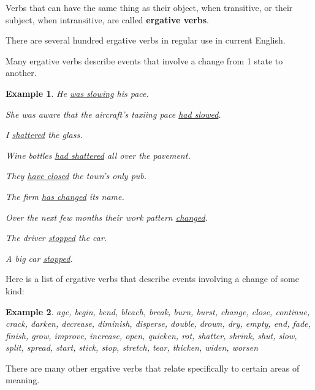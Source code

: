 \documentclass[oneside]{book}
\numberwithin{equation}{section}
\newtheorem{example}{Example}[section]
\begin{document}
%
Verbs that can have the same thing as their object, when transitive, or their subject, when intransitive, are called \textbf{ergative verbs}.

There are several hundred ergative verbs in regular use in current English.

%
\noindent{} Many ergative verbs describe events that involve a change from 1 state to another.
\begin{example}
    He \underline{was slowing} his pace.
    
    She was aware that the aircraft's taxiing pace \underline{had slowed}.
    
    I \underline{shattered} the glass.
    
    Wine bottles \underline{had shattered} all over the pavement.
    
    They \underline{have closed} the town's only pub.
    
    The firm \underline{has changed} its name.
    
    Over the next few months their work pattern \underline{changed}.
    
    The driver \underline{stopped} the car.
    
    A big car \underline{stopped}.
\end{example}
%
\noindent{} Here is a list of ergative verbs that describe events involving a change of some kind:
\begin{example}
    age, begin, bend, bleach, break, burn, burst, change, close, continue, crack, darken, decrease, diminish, disperse, double, drown, dry, empty, end, fade, finish, grow, improve, increase, open, quicken, rot, shatter, shrink, shut, slow, split, spread, start, stick, stop, stretch, tear, thicken, widen, worsen
\end{example}
%
\noindent{} There are many other ergative verbs that relate specifically to certain areas of meaning.
\end{document}
